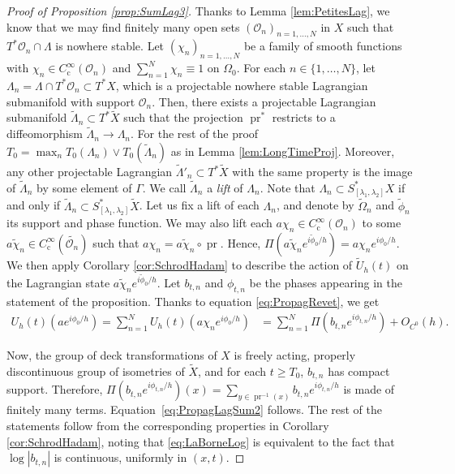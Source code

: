 \documentclass[JEP,XML,SOM,Unicode,published]{cedram}
\let\mathcal\mathscr
\newcommand{\rc}{\mathrm{c}}
\theoremstyle{plain}
\theoremstyle{definition}
\DeclareMathOperator{\pr}{pr}
\begin{document}
\begin{proof}[Proof of Proposition \ref{prop:SumLag3}]
Thanks to Lemma \ref{lem:PetitesLag}, we know that we may find finitely many open sets $(\mathcal{O}_n)_{n=1,\dots,N}$ in $X$ such that $T^*\mathcal{O}_n\cap \Lambda$ is nowhere stable. Let $(\chi_n)_{n=1,\dots,N}$ be a family of smooth functions with $\chi_n\in C_\rc^\infty(\mathcal{O}_n)$ and $\sum_{n=1}^N \chi_n \equiv 1$ on $\Omega_0$. For each $n\in \{1,\dots,N\}$, let $\Lambda_n = \Lambda\cap T^*\mathcal{O}_n\subset T^*X$, which is a projectable nowhere stable Lagrangian submanifold with support $\mathcal{O}_n$. Then, there exists a projectable Lagrangian submanifold $\widetilde{\Lambda}_n\subset T^*\tilde{X}$ such that the projection $\pr^*$ restricts to a diffeomorphism $\widetilde{\Lambda}_n\to\Lambda_n$. For the rest of the proof $T_0=\max_n T_0(\Lambda_n)\vee T_0(\tilde{\Lambda}_n)$ as in Lemma \ref{lem:LongTimeProj}. Moreover, any other projectable Lagrangian $\widetilde{\Lambda}'_n\subset T^*\tilde{X}$ with the same property is the image of $\widetilde{\Lambda}_n$ by some element of $\Gamma$. We call $\widetilde{\Lambda}_n$ a \emph{lift} of $\Lambda_n$. Note that $\Lambda_n\subset S_{[\lambda_1,\lambda_2]}^*X$ if and only if $\widetilde{\Lambda}_n\subset S_{[\lambda_1,\lambda_2]}^*\tilde{X}$. Let us fix a lift of each $\Lambda_n$, and denote by $\widetilde{\Omega}_n$ and $\widetilde{\phi}_n$ its support and phase function. We may also lift each $a\chi_n\in C_\rc^\infty(\mathcal{O}_n)$ to some $\widetilde{a\chi_n}\in C_\rc^\infty(\widetilde{\mathcal{O}_n})$ such that $a\chi_n= \widetilde{a\chi_n}\circ \pr$. Hence, $\Pi(\widetilde{a\chi_n} e^{i\widetilde{\phi}_0/h}) = a\chi_n e^{i\phi_0/h}$. We then apply Corollary \ref{cor:SchrodHadam} to describe the action of $\tilde{U}_h(t)$ on the Lagrangian state $\widetilde{a\chi_n}e^{i\widetilde{\phi}_0/h}$. Let $b_{t,n}$ and $\phi_{t,n}$ be the phases appearing in the statement of the proposition. Thanks to equation \eqref{eq:PropagRevet}, we get
\begin{align*}
U_h(t)(a e^{i\phi_0/h}) = \sum_{n=1}^N U_h(t)(a\chi_n e^{i\phi_0/h}) &= \sum_{n=1}^N \Pi(b_{t,n} e^{i\phi_{t,n}/h}) +O_{C^0}(h).
\end{align*}

Now, the group of deck transformations of $X$ is freely acting, properly discontinuous group of isometries of $\tilde{X}$, and for each $t\geq T_0$, $b_{t,n}$ has compact support. Therefore, $\Pi (b_{t,n} e^{i\phi_{t,n}/h})(x) = \sum_{y\in \pr^{-1}(x)} b_{t,n} e^{i\phi_{t,n}/h} $ is made of finitely many terms. Equation~\eqref{eq:PropagLagSum2} follows. The rest of the statements follow from the corresponding properties in Corollary \ref{cor:SchrodHadam}, noting that \eqref{eq:LaBorneLog} is equivalent to the fact that $\log |b_{t,n}|$ is continuous, uniformly in $(x,t)$.


\end{proof}
\end{document}
